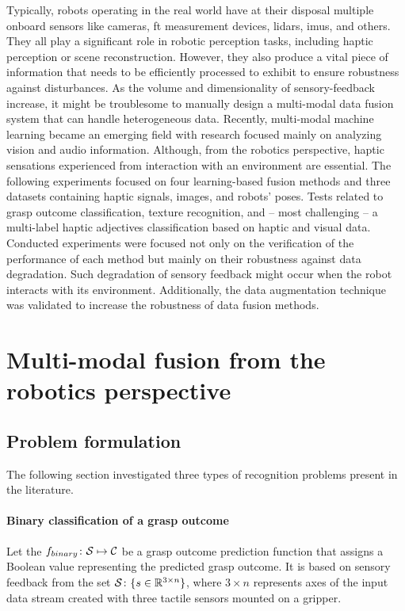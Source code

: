 \documentclass[a4paper, 10pt, twoside]{report}
\begin{document}
Typically, robots operating in the real world have at their disposal multiple onboard sensors like cameras, \acrshort{ft} measurement devices, \acrshort{lidar}s, \acrshort{imu}s, and others. They all play a significant role in robotic perception tasks, including haptic perception or scene reconstruction. However, they also produce a vital piece of information that needs to be efficiently processed to exhibit to ensure robustness against disturbances. As the volume and dimensionality of sensory-feedback increase, it might be troublesome to manually design a multi-modal data fusion system that can handle heterogeneous data. Recently, multi-modal machine learning became an emerging field with research focused mainly on analyzing vision and audio information. Although, from the robotics perspective, haptic sensations experienced from interaction with an environment are essential. The following experiments focused on four learning-based fusion methods and three datasets containing haptic signals, images, and robots’ poses. Tests related to grasp outcome classification, texture recognition, and -- most challenging -- a multi-label haptic adjectives classification based on haptic and visual data. Conducted experiments were focused not only on the verification of the performance of each method but mainly on their robustness against data degradation. Such degradation of sensory feedback might occur when the robot interacts with its environment. Additionally, the data augmentation technique was validated to increase the robustness of data fusion methods.

\section{Multi-modal fusion from the robotics perspective}
\label{part:methods:fusion:multimodal}

\subsection{Problem formulation}
\label{part:methods:fusion:multimodal:problem}

The following section investigated three types of recognition problems present in the literature. 

\paragraph{Binary classification of a grasp outcome} Let the $f_{binary} \colon {\cal S} \mapsto {\cal C}$ be a grasp outcome prediction function that assigns a Boolean value representing the predicted grasp outcome. It is based on sensory feedback from the set ${\cal S} \colon \{s \in \mathbb{R}^{3 \times n}\}$, where $3 \times n$ represents axes of the input data stream created with three tactile sensors mounted on a gripper.
\end{document}
